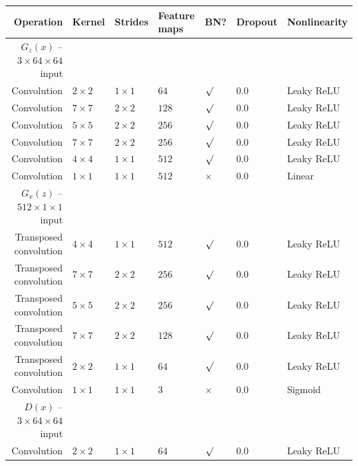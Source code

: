 \documentclass{article}
\begin{document}
\begin{table}[h]
\centering
\begin{tabular}{@{}rllllll@{}} \toprule
Operation              & Kernel       & Strides      & Feature maps & BN?          & Dropout & Nonlinearity \\ \midrule
$G_z(x)$ -- $3 \times 64 \times 64$ input                                                                 \\
Convolution            & $2 \times 2$ & $1 \times 1$ & $64$         & $\surd$      & 0.0     & Leaky ReLU \\
Convolution            & $7 \times 7$ & $2 \times 2$ & $128$        & $\surd$      & 0.0     & Leaky ReLU \\
Convolution            & $5 \times 5$ & $2 \times 2$ & $256$        & $\surd$      & 0.0     & Leaky ReLU \\
Convolution            & $7 \times 7$ & $2 \times 2$ & $256$        & $\surd$      & 0.0     & Leaky ReLU \\
Convolution            & $4 \times 4$ & $1 \times 1$ & $512$        & $\surd$      & 0.0     & Leaky ReLU \\
Convolution            & $1 \times 1$ & $1 \times 1$ & $512$        & $\times$     & 0.0     & Linear     \\
$G_x(z)$ -- $512 \times 1 \times 1$ input                                                                 \\
Transposed convolution & $4 \times 4$ & $1 \times 1$ & $512$        & $\surd$      & 0.0     & Leaky ReLU \\
Transposed convolution & $7 \times 7$ & $2 \times 2$ & $256$        & $\surd$      & 0.0     & Leaky ReLU \\
Transposed convolution & $5 \times 5$ & $2 \times 2$ & $256$         & $\surd$      & 0.0     & Leaky ReLU \\
Transposed convolution & $7 \times 7$ & $2 \times 2$ & $128$         & $\surd$      & 0.0     & Leaky ReLU \\
Transposed convolution & $2 \times 2$ & $1 \times 1$ & $64$         & $\surd$      & 0.0     & Leaky ReLU \\
Convolution            & $1 \times 1$ & $1 \times 1$ & $3$          & $\times$     & 0.0     & Sigmoid    \\
$D(x)$ -- $3 \times 64 \times 64$ input                                                                   \\
Convolution            & $2 \times 2$ & $1 \times 1$ & $64$         & $\surd$      & 0.0     & Leaky ReLU \\

\end{tabular}
\end{table}
\end{document}
